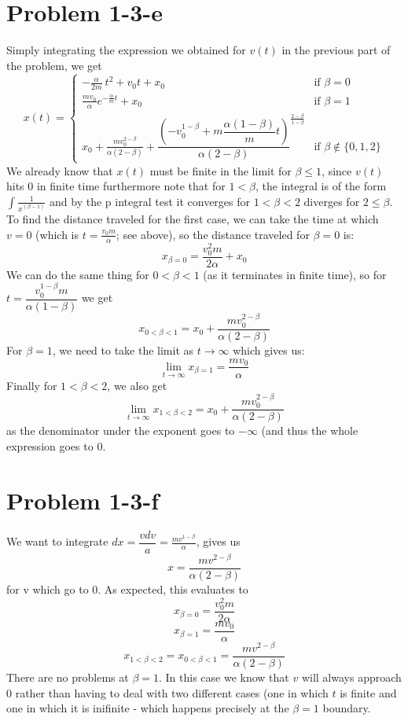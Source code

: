\section*{Problem 1-3-e}
Simply integrating the expression we obtained for $v(t)$ in the previous part of the problem, we get
 \[ x(t) = \begin{cases} -\frac{\alpha}{2m}\ t^2 + v_0t + x_0 &\mbox{if } \beta = 0 \\ 
\frac{mv_0}{\alpha}e^{-\frac{\alpha}{m} t} + x_0 & \mbox{if }  \beta = 1 \\
 x_0 + \frac{m v_0^{2-\beta}}{\alpha(2-\beta)} + \dfrac{\left(-v_0^{1-\beta}+m\dfrac{\alpha(1-\beta)}{m}t\right)}{\alpha(2-\beta)}^{\frac{2-\beta}{1-\beta}} & \mbox{if } \beta \notin \{0,1,2\} \end{cases}  \]
 We already know that $x(t)$ must be finite in the limit for $\beta\leq 1$, since $v(t)$ hits $0$ in finite time furthermore note that for $1 < \beta$, the integral is of the form $\int \frac{1}{x^(\beta-1)}$ and by the p integral test it converges for  $1<\beta<2$ diverges for $2\leq \beta$. To find the distance traveled for the first case, we can take the time at which $v=0$ (which is $t=\frac{v_0m}{\alpha}$; see above), so the distance traveled for $\beta=0$ is:
 \[ x_{\beta=0} = \frac{v_0^2m}{2\alpha} + x_0 \]
 We can do the same thing for $0<\beta<1$ (as it terminates in finite time), so for $t= \dfrac{v_0^{1-\beta}m}{\alpha(1-\beta)}$ we get
 \[ x_{0<\beta<1} = x_0 + \dfrac{mv_0^{2-\beta}}{\alpha(2-\beta)}\]
For $\beta = 1$, we need to take the limit as $t\to\infty$ which gives us:
\[\lim\limits_{t\to\infty} x_{\beta=1} =\frac{mv_0}{\alpha} \]
Finally for $1<\beta<2$, we  also get
\[ \lim\limits_{t\to\infty} x_{1<\beta<2} = x_0 + \dfrac{mv_0^{2-\beta}}{\alpha(2-\beta)} \]
as the denominator under the exponent goes to $-\infty$ (and thus the whole expression goes to $0$.
\section*{Problem 1-3-f}
We want to integrate $dx=\dfrac{v dv}{a}=\frac{mv^{1-\beta}}{\alpha}$, gives us 
\[ x = \frac{mv^{2-\beta}}{\alpha(2-\beta)}\]
for v which go to $0$.
As expected, this evaluates to 
 \[ x_{\beta=0} = \frac{v_0^2m}{2\alpha} \]
 \[ x_{\beta=1} = \frac{mv_0}{\alpha} \]
 \[ x_{1<\beta<2} = x_{0<\beta<1} =  \frac{mv^{2-\beta}}{\alpha(2-\beta)} \]
 There are no problems at $\beta = 1$. In this case we know that $v$ will always approach $0$ rather than having to deal with two different cases (one in which $t$ is finite and one in which it is inifinite - which happens precisely at the $\beta=1$ boundary.
